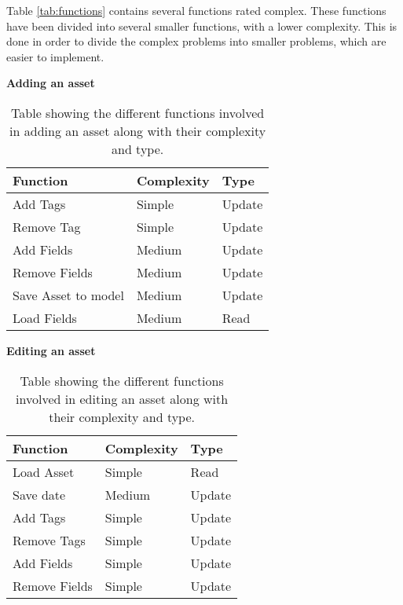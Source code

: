 Table \ref{tab:functions} contains several functions rated complex. These functions have been divided into several smaller functions, with a lower complexity.
This is done in order to divide the complex problems into smaller problems, which are easier to implement. 
 
\begin{center}
    \textbf{Adding an asset}
\end{center}

\begin{table}[H]
\centering
    \begin{tabular}{|l|l|l|}
        \hline
        \textbf{Function} & \textbf{Complexity} & \textbf{Type} \\
        \hline
        \hline
        Add Tags & Simple & Update\\
        \hline
        Remove Tag & Simple & Update\\
        \hline
        Add Fields & Medium & Update\\
        \hline
        Remove Fields & Medium & Update\\
        \hline
        Save Asset to model & Medium & Update\\
        \hline
        Load Fields & Medium & Read\\
        \hline
        
    \end{tabular}
\caption{Table showing the different functions involved in adding an asset along with their complexity and type.}\label{tab:AddAssetFunctions}
\end{table}

\par

\begin{center}
    \textbf{Editing an asset}
\end{center}

\begin{table}[H]
\centering
    \begin{tabular}{|l|l|l|}
        \hline
        \textbf{Function} & \textbf{Complexity} & \textbf{Type} \\
        \hline
        \hline
        Load Asset & Simple & Read\\
        \hline
        Save date & Medium & Update\\
        \hline
        Add Tags & Simple & Update\\
        \hline
        Remove Tags & Simple & Update\\
        \hline
        Add Fields & Simple & Update\\
        \hline
        Remove Fields & Simple & Update\\
        \hline
        
    \end{tabular}
\caption{Table showing the different functions involved in editing an asset along with their complexity and type.}\label{tab:EditAssetFunctions}
\end{table}

